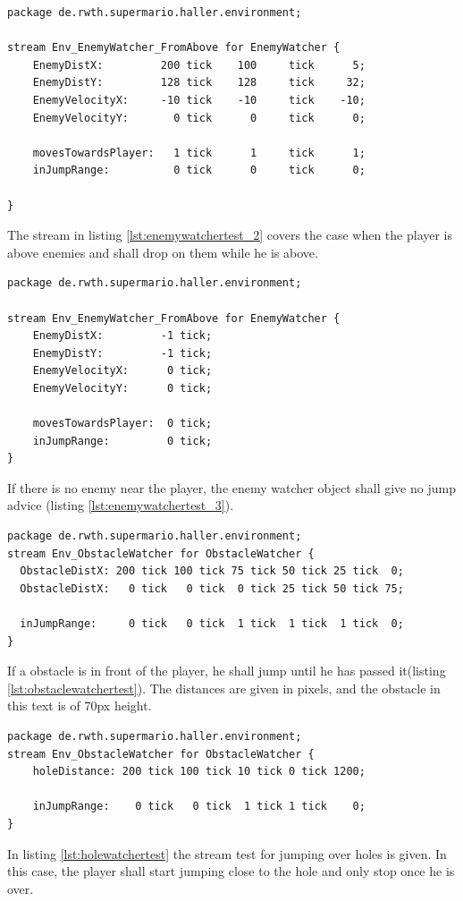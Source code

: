 \begin{lstlisting}[float,label=lst:enemywatchertest_2, caption=Enemy watcher stream test]
package de.rwth.supermario.haller.environment;

stream Env_EnemyWatcher_FromAbove for EnemyWatcher {    
    EnemyDistX:         200 tick    100     tick      5;
    EnemyDistY:         128 tick    128     tick     32;
    EnemyVelocityX:     -10 tick    -10     tick    -10;
    EnemyVelocityY:       0 tick      0     tick      0;
            
    movesTowardsPlayer:   1 tick      1     tick      1;
    inJumpRange:          0 tick      0     tick      0;

}
\end{lstlisting}
The stream in listing \ref{lst:enemywatchertest_2} covers the case when the player is above enemies and shall drop on them while he is above.



\begin{lstlisting}[float,label=lst:enemywatchertest_3, caption=Enemy watcher stream test]
package de.rwth.supermario.haller.environment;

stream Env_EnemyWatcher_FromAbove for EnemyWatcher {   
    EnemyDistX:         -1 tick;
    EnemyDistY:         -1 tick;
    EnemyVelocityX:      0 tick;
    EnemyVelocityY:      0 tick;
            
    movesTowardsPlayer:  0 tick;
    inJumpRange:         0 tick;
}
\end{lstlisting}
If there is no enemy near the player, the enemy watcher object shall give no jump advice (listing \ref{lst:enemywatchertest_3}).



\begin{lstlisting}[float,label=lst:obstaclewatchertest, caption=Obstacle watcher stream test]
package de.rwth.supermario.haller.environment;
stream Env_ObstacleWatcher for ObstacleWatcher {
  ObstacleDistX: 200 tick 100 tick 75 tick 50 tick 25 tick  0;
  ObstacleDistX:   0 tick   0 tick  0 tick 25 tick 50 tick 75;
    
  inJumpRange:     0 tick   0 tick  1 tick  1 tick  1 tick  0;
}
\end{lstlisting}
If a obstacle is in front of the player, he shall jump until he has passed it(listing \ref{lst:obstaclewatchertest}). The distances are given in pixels, and the obstacle in this text is of 70px height.

\begin{lstlisting}[float,label=lst:holewatchertest, caption=Hole watcher stream test]
package de.rwth.supermario.haller.environment;
stream Env_ObstacleWatcher for ObstacleWatcher {
    holeDistance: 200 tick 100 tick 10 tick 0 tick 1200;
    
    inJumpRange:    0 tick   0 tick  1 tick	1 tick    0;
}
\end{lstlisting}

In listing \ref{lst:holewatchertest} the stream test for jumping over holes is given. In this case, the player shall start jumping close to the hole and only stop once he is over.


